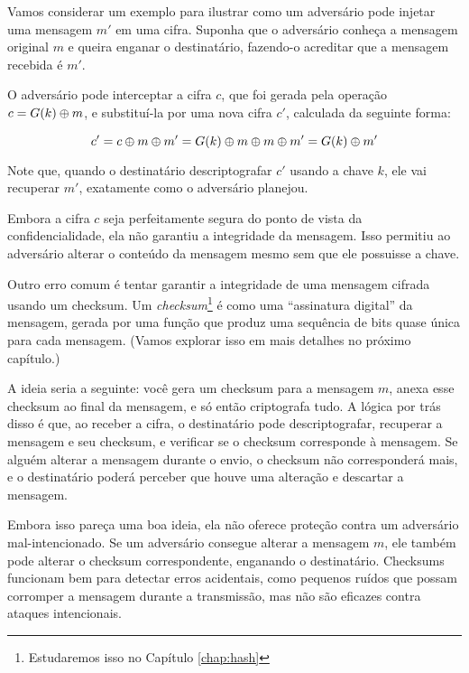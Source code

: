\begin{example}
Vamos considerar um exemplo para ilustrar como um adversário pode injetar uma mensagem $m'$ em uma cifra.
Suponha que o adversário conheça a mensagem original $m$ e queira enganar o destinatário, fazendo-o acreditar que a mensagem recebida é $m'$.

O adversário pode interceptar a cifra $c$, que foi gerada pela operação $c = G(k) \oplus m$, e substituí-la por uma nova cifra $c'$, calculada da seguinte forma:

\begin{displaymath}
c' = c \oplus m \oplus m' = G(k) \oplus m \oplus m \oplus m' = G(k) \oplus m'
\end{displaymath}

Note que, quando o destinatário descriptografar $c'$ usando a chave $k$, ele vai recuperar $m'$, exatamente como o adversário planejou.

Embora a cifra $c$ seja perfeitamente segura do ponto de vista da confidencialidade, ela não garantiu a integridade da mensagem.
Isso permitiu ao adversário alterar o conteúdo da mensagem mesmo sem que ele possuisse a chave.
\end{example}

\begin{example}
  Outro erro comum é tentar garantir a integridade de uma mensagem cifrada usando um checksum.
  Um {\em checksum}\footnote{Estudaremos isso no Capítulo \ref{chap:hash}} é como uma ``assinatura digital'' da mensagem, gerada por uma função que produz uma sequência de bits quase única para cada mensagem.
(Vamos explorar isso em mais detalhes no próximo capítulo.)

A ideia seria a seguinte: você gera um checksum para a mensagem $m$, anexa esse checksum ao final da mensagem, e só então criptografa tudo.
A lógica por trás disso é que, ao receber a cifra, o destinatário pode descriptografar, recuperar a mensagem e seu checksum, e verificar se o checksum corresponde à mensagem.
Se alguém alterar a mensagem durante o envio, o checksum não corresponderá mais, e o destinatário poderá perceber que houve uma alteração e descartar a mensagem.

Embora isso pareça uma boa ideia, ela não oferece proteção contra um adversário mal-intencionado.
Se um adversário consegue alterar a mensagem $m$, ele também pode alterar o checksum correspondente, enganando o destinatário.
Checksums funcionam bem para detectar erros acidentais, como pequenos ruídos que possam corromper a mensagem durante a transmissão, mas não são eficazes contra ataques intencionais.

\end{example}

